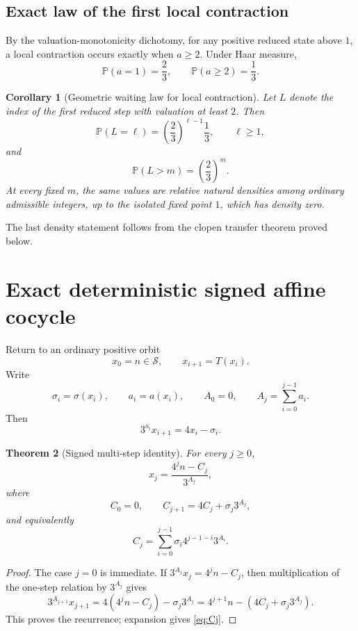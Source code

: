 \documentclass[11pt]{article}
\newtheorem{theorem}{Theorem}[section]
\newtheorem{corollary}[theorem]{Corollary}
\theoremstyle{definition}
\theoremstyle{remark}
\newcommand{\Sset}{\mathcal S}
\newcommand{\Prob}{\mathbb P}
\begin{document}
\subsection{Exact law of the first local contraction}

By the valuation-monotonicity dichotomy, for any positive reduced state above $1$, a local contraction occurs exactly when $a\ge2$.  Under Haar measure,
\[
\Prob(a=1)=\frac23,
\qquad
\Prob(a\ge2)=\frac13.
\]

\begin{corollary}[Geometric waiting law for local contraction]
Let $L$ denote the index of the first reduced step with valuation at least $2$.  Then
\[
\Prob(L=\ell)=\left(\frac23\right)^{\ell-1}\frac13,
\qquad \ell\ge1,
\]
and
\[
\Prob(L>m)=\left(\frac23\right)^m.
\]
At every fixed $m$, the same values are relative natural densities among ordinary admissible integers, up to the isolated fixed point $1$, which has density zero.
\end{corollary}

The last density statement follows from the clopen transfer theorem proved below.

\section{Exact deterministic signed affine cocycle}

Return to an ordinary positive orbit
\[
x_0=n\in\Sset,
\qquad
x_{i+1}=T(x_i).
\]
Write
\[
\sigma_i=\sigma(x_i),
\qquad
a_i=a(x_i),
\qquad
A_0=0,
\qquad
A_j=\sum_{i=0}^{j-1}a_i.
\]
Then
\[
3^{a_i}x_{i+1}=4x_i-\sigma_i.
\]

\begin{theorem}[Signed multi-step identity]
For every $j\ge0$,
\begin{equation}
x_j=\frac{4^j n-C_j}{3^{A_j}},
\label{eq:multi-step}
\end{equation}
where
\[
C_0=0,
\qquad
C_{j+1}=4C_j+\sigma_j3^{A_j},
\]
and equivalently
\begin{equation}
C_j=\sum_{i=0}^{j-1}\sigma_i4^{j-1-i}3^{A_i}.
\label{eq:Cj}
\end{equation}
\end{theorem}

\begin{proof}
The case $j=0$ is immediate.  If
\(
3^{A_j}x_j=4^j n-C_j
\), then multiplication of the one-step relation by $3^{A_j}$ gives
\[
3^{A_{j+1}}x_{j+1}
=4(4^j n-C_j)-\sigma_j3^{A_j}
=4^{j+1}n-(4C_j+\sigma_j3^{A_j}).
\]
This proves the recurrence; expansion gives \eqref{eq:Cj}.
\end{proof}
\end{document}
